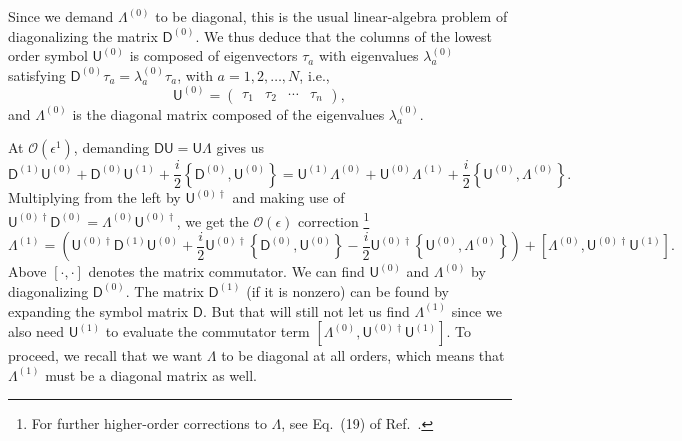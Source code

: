 %
Since we demand $\Lambda^{(0)}$ to be diagonal, this is the usual linear-algebra problem of diagonalizing the matrix $\mathsf{D}^{(0)}$.
We thus deduce that the columns of the lowest order symbol $\mathsf{U}^{(0)}$ is composed of eigenvectors $\tau_{a}$ with eigenvalues $\lambda^{(0)}_{a}$ satisfying $\mathsf{D}^{(0)}\tau_{a} = \lambda^{(0)}_{a}\tau_{a}$, with $a = 1,2,\ldots,N$, i.e.,
%
\begin{equation}
  \mathsf{U}^{(0)} =
  \begin{pmatrix}
    \tau_{1} & \tau_{2} & \cdots & \tau_{n}
  \end{pmatrix},
\end{equation}
%
and $\Lambda^{(0)}$ is the diagonal matrix composed of the eigenvalues $\lambda_{a}^{(0)}$.

At $\mathcal{O}(\epsilon^{1})$, demanding $\mathsf{D}\mathsf{U} = \mathsf{U}\Lambda$ gives us
%
\begin{equation}
\mathsf{D}^{(1)}\mathsf{U}^{(0)} + \mathsf{D}^{(0)}\mathsf{U}^{(1)} + \frac{i}{2}\left\{\mathsf{D}^{(0)}, \mathsf{U}^{(0)}\right\} =
  \mathsf{U}^{(1)}\Lambda^{(0)} + \mathsf{U}^{(0)}\Lambda^{(1)} + \frac{i}{2}\left\{\mathsf{U}^{(0)}, \Lambda^{(0)}\right\}.
\end{equation}
%
Multiplying from the left by $\mathsf{U}^{(0)\dagger}$ and making use of $\mathsf{U}^{(0)\dagger}\mathsf{D}^{(0)} = \Lambda^{(0)}\mathsf{U}^{(0)\dagger}$, we get the $\mathcal{O}(\epsilon)$ correction%
\footnote{For further higher-order corrections to $\Lambda$, see Eq.~(19) of Ref.~\cite{weigert1993}.}
%
\begin{equation}
  \Lambda^{(1)} = \left(\mathsf{U}^{(0)\dagger}\mathsf{D}^{(1)}\mathsf{U}^{(0)} +
  \frac{i}{2}\mathsf{U}^{(0)\dagger}\left\{\mathsf{D}^{(0)},\mathsf{U}^{(0)}\right\} - \frac{i}{2}\mathsf{U}^{(0)\dagger}\left\{\mathsf{U}^{(0)},\Lambda^{(0)}\right\}\right) + \left[\Lambda^{(0)},\mathsf{U}^{(0)\dagger}\mathsf{U}^{(1)}\right].
  \label{eq:Lambda1}
\end{equation}
%
Above $[\cdot,\cdot]$ denotes the matrix commutator.
We can find $\mathsf{U}^{(0)}$ and $\Lambda^{(0)}$ by diagonalizing $\mathsf{D}^{(0)}$.
The matrix $\mathsf{D}^{(1)}$ (if it is nonzero) can be found by expanding the symbol matrix $\mathsf{D}$.
But that will still not let us find $\Lambda^{(1)}$ since we also need $\mathsf{U}^{(1)}$ to evaluate the commutator term $[\Lambda^{(0)},\mathsf{U}^{(0)\dagger}\mathsf{U}^{(1)}]$.
To proceed, we recall that we want $\Lambda$ to be diagonal at all orders, which means that $\Lambda^{(1)}$ must be a diagonal matrix as well.
